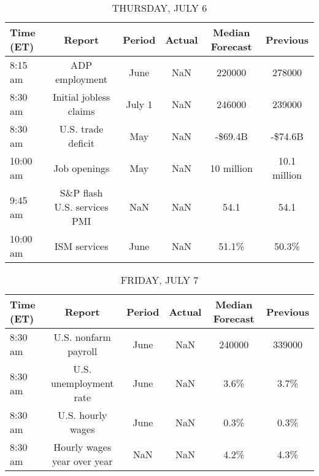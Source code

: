 \documentclass{article}%
\begin{document}
%


\begin{table}[htbp]%
\caption{THURSDAY, JULY 6}%
\centering%
\begin{adjustbox}{width=1\textwidth}%
\begin{tabular}{lccccc}
\toprule
Time (ET) &                      Report & Period & Actual & Median Forecast &     Previous \\
\midrule
  8:15 am &              ADP employment &   June &    NaN &          220000 &       278000 \\
  8:30 am &      Initial jobless claims & July 1 &    NaN &          246000 &       239000 \\
  8:30 am &          U.S. trade deficit &    May &    NaN &         -\$69.4B &      -\$74.6B \\
 10:00 am &                Job openings &    May &    NaN &      10 million & 10.1 million \\
  9:45 am & S\&P flash U.S. services PMI &    NaN &    NaN &            54.1 &         54.1 \\
 10:00 am &                ISM services &   June &    NaN &           51.1\% &        50.3\% \\
\bottomrule
\end{tabular}
%
\end{adjustbox}%
\end{table}

%


\begin{table}[htbp]%
\caption{FRIDAY, JULY 7}%
\centering%
\begin{adjustbox}{width=1\textwidth}%
\begin{tabular}{lccccc}
\toprule
Time (ET) &                      Report & Period & Actual & Median Forecast & Previous \\
\midrule
  8:30 am &        U.S. nonfarm payroll &   June &    NaN &          240000 &   339000 \\
  8:30 am &      U.S. unemployment rate &   June &    NaN &            3.6\% &     3.7\% \\
  8:30 am &           U.S. hourly wages &   June &    NaN &            0.3\% &     0.3\% \\
  8:30 am & Hourly wages year over year &    NaN &    NaN &            4.2\% &     4.3\% \\
\bottomrule
\end{tabular}
%
\end{adjustbox}%
\end{table}
\end{document}
